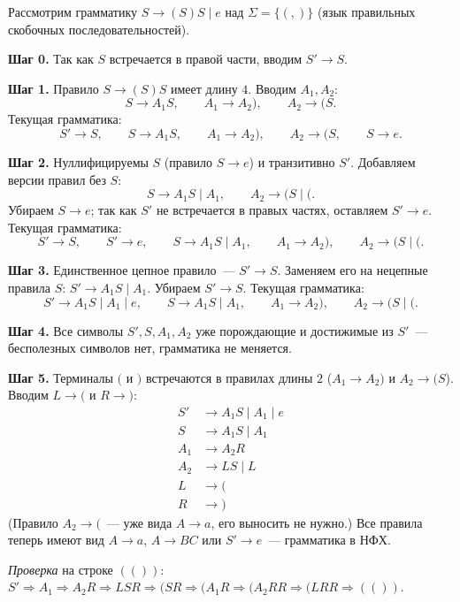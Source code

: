 \documentclass[12pt]{article}
\begin{document}
    \begin{example}
    	Рассмотрим грамматику $S \rightarrow (S)S \mid e$ над $\Sigma = \{(, )\}$ (язык правильных скобочных последовательностей).
    	
    	\textbf{Шаг 0.} Так как $S$ встречается в правой части, вводим $S' \rightarrow S$.
    	
    	\textbf{Шаг 1.} Правило $S \rightarrow (S)S$ имеет длину $4$. Вводим $A_1, A_2$:
    	\[
    	S \rightarrow A_1S, \qquad A_1 \rightarrow A_2), \qquad A_2 \rightarrow (S.
    	\]
    	Текущая грамматика:
    	\[
    	S' \rightarrow S, \qquad S \rightarrow A_1S, \qquad A_1 \rightarrow A_2), \qquad A_2 \rightarrow (S, \qquad S \rightarrow e.
    	\]
    	
    	\textbf{Шаг 2.} Нуллифицируемы $S$ (правило $S \rightarrow e$) и транзитивно $S'$. Добавляем версии правил без $S$:
    	\[
    	S \rightarrow A_1S \mid A_1, \qquad A_2 \rightarrow (S \mid (.
    	\]
    	Убираем $S \rightarrow e$; так как $S'$ не встречается в правых частях, оставляем $S' \rightarrow e$. Текущая грамматика:
    	\[
    	S' \rightarrow S, \qquad S' \rightarrow e, \qquad S \rightarrow A_1S \mid A_1, \qquad A_1 \rightarrow A_2), \qquad A_2 \rightarrow (S \mid (.
    	\]
    	
    	\textbf{Шаг 3.} Единственное цепное правило~--- $S' \rightarrow S$. Заменяем его на нецепные правила $S$: $S' \rightarrow A_1S \mid A_1$. Убираем $S' \rightarrow S$. Текущая грамматика:
    	\[
    	S' \rightarrow A_1S \mid A_1 \mid e, \qquad S \rightarrow A_1S \mid A_1, \qquad A_1 \rightarrow A_2), \qquad A_2 \rightarrow (S \mid (.
    	\]
    	
    	\textbf{Шаг 4.} Все символы $S', S, A_1, A_2$ уже порождающие и достижимые из $S'$~--- бесполезных символов нет, грамматика не меняется.
    	
    	\textbf{Шаг 5.} Терминалы $($ и $)$ встречаются в правилах длины $2$ ($A_1 \rightarrow A_2)$ и $A_2 \rightarrow (S$). Вводим $L \rightarrow ($ и $R \rightarrow )$:
    	\[
    	\boxed{
    	\begin{aligned}
    		S' &\rightarrow A_1S \mid A_1 \mid e \\
    		S &\rightarrow A_1S \mid A_1 \\
    		A_1 &\rightarrow A_2R \\
    		A_2 &\rightarrow LS \mid L \\
    		L &\rightarrow ( \\
    		R &\rightarrow )
    	\end{aligned}
    	}
    	\]
    	(Правило $A_2 \rightarrow ($~--- уже вида $A \rightarrow a$, его выносить не нужно.) Все правила теперь имеют вид $A \rightarrow a$, $A \rightarrow BC$ или $S' \rightarrow e$~--- грамматика в НФХ.
    	
    	\textit{Проверка} на строке $(())$: $S' \Rightarrow A_1 \Rightarrow A_2R \Rightarrow LSR \Rightarrow (SR \Rightarrow (A_1R \Rightarrow (A_2RR \Rightarrow (LRR \Rightarrow (())$.
    \end{example}
    
\end{document}
